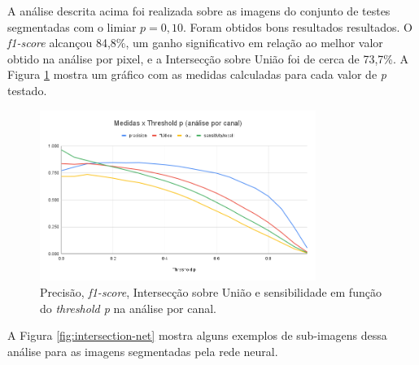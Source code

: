 A análise descrita acima foi realizada sobre as imagens do conjunto de testes segmentadas com o limiar \(p = 0,10\). Foram obtidos bons resultados resultados. O \textit{f1-score} alcançou 84,8\%, um ganho significativo em relação ao melhor valor obtido na análise por pixel, e a Intersecção sobre União foi de cerca de 73,7\%. A Figura \ref{fig:graphic-metrics-x-p-per-canal} mostra um gráfico com as medidas calculadas para cada valor de \textit{p} testado.

\begin{figure}[H]
    \center
\includegraphics[width=0.8\textwidth]{figures/4_results/Medidas x Threshold p (análise por canal).png}
  
    \caption[Métricas obtidas na análise por canal.]{Precisão, \textit{f1-score}, Intersecção sobre União e sensibilidade em função do \textit{threshold p} na análise por canal.}
    \label{fig:graphic-metrics-x-p-per-canal}
\end{figure}



A Figura \ref{fig:intersection-net} mostra alguns exemplos de sub-imagens dessa análise para as imagens segmentadas pela rede neural.

